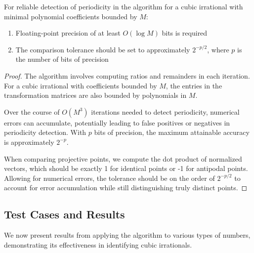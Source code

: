 \begin{proposition}\label{prop:numerical_precision}
For reliable detection of periodicity in the \HAPD{} algorithm for a cubic irrational with minimal polynomial coefficients bounded by $M$:
\begin{enumerate}
    \item Floating-point precision of at least $O(\log M)$ bits is required
    \item The comparison tolerance should be set to approximately $2^{-p/2}$, where $p$ is the number of bits of precision
\end{enumerate}
\end{proposition}

\begin{proof}
The algorithm involves computing ratios and remainders in each iteration. For a cubic irrational with coefficients bounded by $M$, the entries in the transformation matrices are also bounded by polynomials in $M$.

Over the course of $O(M^3)$ iterations needed to detect periodicity, numerical errors can accumulate, potentially leading to false positives or negatives in periodicity detection. With $p$ bits of precision, the maximum attainable accuracy is approximately $2^{-p}$.

When comparing projective points, we compute the dot product of normalized vectors, which should be exactly 1 for identical points or -1 for antipodal points. Allowing for numerical errors, the tolerance should be on the order of $2^{-p/2}$ to account for error accumulation while still distinguishing truly distinct points.
\end{proof}

\subsection{Test Cases and Results}

We now present results from applying the \HAPD{} algorithm to various types of numbers, demonstrating its effectiveness in identifying cubic irrationals.

